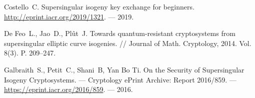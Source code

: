 \documentclass[a4paper,12pt]{article}
\theoremstyle{definition}
\begin{document}
\begin{thebibliography}{1}

 Costello~C. Supersingular isogeny key exchange for beginners. \url{http://eprint.iacr.org/2019/1321}. --- 2019.

 
 
   De Feo~L., Jao~D., Plût~J.   Towards quantum-resistant cryptosystems from supersingular elliptic curve isogenies.  // Journal of Math. Cryptology, 2014. Vol. 8(3). P. 209--247. 

%  




  


Galbraith~S., Petit~C.,  Shani~B, Yan Bo Ti.
\newblock
On the Security of Supersingular Isogeny Cryptosystems. --- 
Cryptology ePrint Archive: Report 2016/859. --- \newblock \url{https://eprint.iacr.org/2016/859}. --- 2016.


\end{thebibliography}
\end{document}

